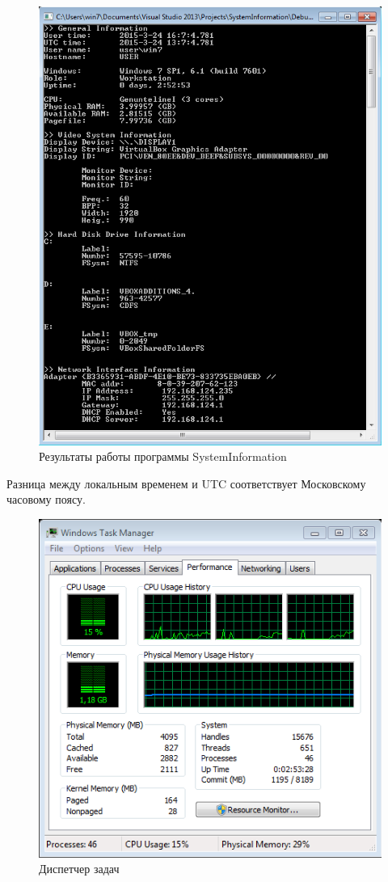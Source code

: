 \documentclass[a4paper, 12pt]{report}		%
\begin{document}
\begin{figure}[h!]
\centering
\includegraphics[scale=1]{res/results}
\caption{Результаты работы программы SystemInformation}
\end{figure}

Разница между локальным временем и UTC соответствует Московскому часовому поясу.

\begin{figure}[h!]
\centering
\includegraphics[scale=0.9]{res/taskmanager}
\caption{Диспетчер задач}
\end{figure}
\end{document}
